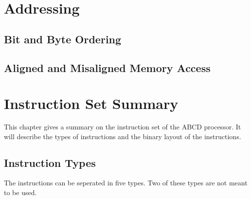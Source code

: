 \documentclass[oneside, a4paper]{memoir}
\begin{document}
\chapter{Addressing}
\label{ch:Addressing}
\section{Bit and Byte Ordering}
\section{Aligned and Misaligned Memory Access}


\chapter{Instruction Set Summary}
\label{ch:Instruction Set Summary}
This chapter gives a summary on the instruction set of the ABCD processor. It will describe the types of instructions and the binary layout of the instructions.
\section{Instruction Types}
The instructions can be seperated in five types. Two of these types are not meant to be used. 
\end{document}
